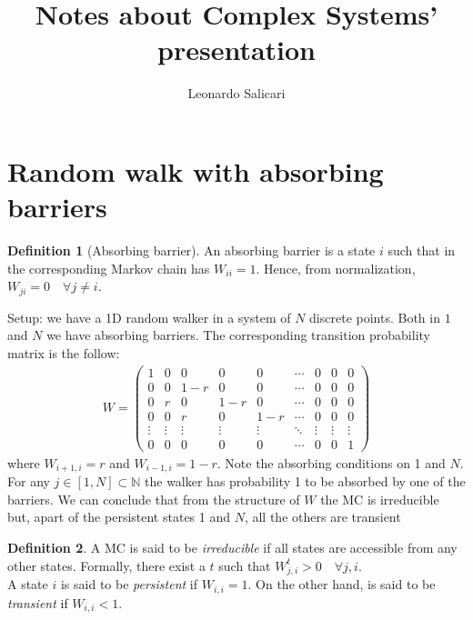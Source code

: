 \documentclass[4apaper,11pt,fleqn]{article}
\title{Notes about Complex Systems' presentation}
\author{Leonardo Salicari}
\theoremstyle{remark}
\theoremstyle{definition}
\newtheorem*{dfn}{Definition}
\begin{document}
\maketitle
\tableofcontents


\section{Random walk with absorbing barriers}
\begin{dfn}[Absorbing barrier]
  An absorbing barrier is a state $i$ such that in the corresponding Markov chain has $W_{ii} = 1$.
  Hence, from normalization, $W_{ji} = 0 \quad \forall  j \neq i$.
\end{dfn}
Setup: we have a 1D random walker in a system of $N$ discrete   points. Both in $1$ and $N$ we have absorbing barriers. The corresponding transition probability matrix is the follow:
\begin{align*}
  W = \left( \begin{array}{ccccccccc}{1} & {0} & {0} & {0} & {0} & {\cdots} & {0} & {0} & {0} \\ {0} & {0} & {1-r} & {0} & {0} & {\cdots} & {0} & {0} & {0} \\ {0} & {r} & {0} & {1-r} & {0} & {\cdots} & {0} & {0} & {0} \\ {0} & {0} & {r} & {0} & {1-r} & {\cdots} & {0} & {0} & {0} \\ {\vdots} & {\vdots} & {\vdots} & {\vdots} & {\vdots} & {\ddots} & {\vdots} & {\vdots} & {\vdots} \\ {0} & {0} & {0} & {0} & {0} & {\cdots} & {0} & {0} & {1} \end{array} \right)
\end{align*}
where $ W_{i+1,i} = r $ and $W_{i-1,i} = 1-r$. Note the absorbing conditions on 1 and $N$.\\
For any $j \in [1,N] \subset \mathbb{N}$ the walker has probability 1 to be absorbed by one of the barriers. We can conclude that from the structure of $W$ the MC is irreducible but, apart of the persistent states 1 and $N$, all the others are transient
\begin{dfn}
  A MC is said to be \emph{irreducible} if all states are accessible from any other states. Formally, there exist a $t$ such that $W^t_{j,i} > 0 \quad \forall j, i$.\\
  A state $i$ is said to be \emph{persistent} if $W_{i,i}=1$. On the other hand, is said to be \emph{transient} if $W_{i,i}<1$.
\end{dfn}
\end{document}
